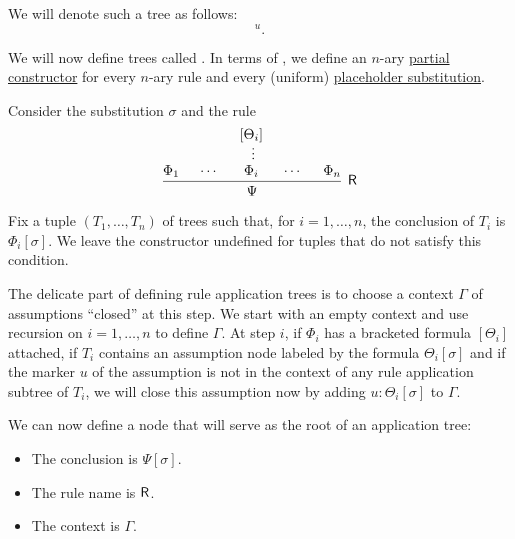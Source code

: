 \begin{definition}
\begin{thmenum}[resume=def:natural_deduction_proof_tree]
    We will denote such a tree as follows:
    \begin{equation*}
      [\varphi]^u.
    \end{equation*}

     We will now define trees called . In terms of , we define an \( n \)-ary \hyperref[thm:least_fixed_point_recursion/base]{partial constructor} for every \( n \)-ary rule and every (uniform) \hyperref[def:uniform_placeholder_substitution]{placeholder substitution}.

    Consider the substitution \( \sigma \) and the rule
    \begin{equation*}
      \begin{prooftree}
        \hypo{ \Phi_1 }
        \hypo{ \cdots }
        \hypo{ [\Theta_i] }
        \ellipsis {} { \Phi_i }
        \hypo{ \cdots }
        \hypo{ \Phi_n }
        \infer5[\logic{R}]{ \Psi }
      \end{prooftree}
    \end{equation*}

    Fix a tuple \( (T_1, \ldots, T_n) \) of trees such that, for \( i = 1, \ldots, n \), the conclusion of \( T_i \) is \( \Phi_i[\sigma] \). We leave the constructor undefined for tuples that do not satisfy this condition.

    The delicate part of defining rule application trees is to choose a context \( \Gamma \) of assumptions \enquote{closed} at this step. We start with an empty context and use recursion on \( i = 1, \ldots, n \) to define \( \Gamma \). At step \( i \), if \( \Phi_i \) has a bracketed formula \( [\Theta_i] \) attached, if \( T_i \) contains an assumption node labeled by the formula \( \Theta_i[\sigma] \) and if the marker \( u \) of the assumption is not in the context of any rule application subtree of \( T_i \), we will close this assumption now by adding \( u: \Theta_i[\sigma] \) to \( \Gamma \).

    We can now define a node that will serve as the root of an application tree:
    \begin{itemize}
      \item The conclusion is \( \Psi[\sigma] \).
      \item The rule name is \( \textsf{R} \).
      \item The context is \( \Gamma \).
    \end{itemize}


\end{thmenum}
\end{definition}
